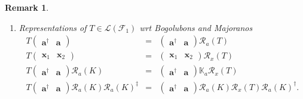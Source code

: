 \documentclass[aps,preprint]{revtex4}
\newtheorem{remark}[theorem]{Remark}
\begin{document}
\begin{remark}
\begin{enumerate}
\item Representations of $T\in \mathcal{L}\left( \mathcal{F}_{1}\right) $
wrt Bogolubons and Majoranos 
\begin{eqnarray}
T\left( 
\begin{array}{cc}
\mathbf{a}^{\dagger } & \mathbf{a}%
\end{array}%
\right) &=&\left( 
\begin{array}{cc}
\mathbf{a}^{\dagger } & \mathbf{a}%
\end{array}%
\right) \mathcal{R}_{a}\left( T\right) \\
T\left( 
\begin{array}{cc}
\mathbf{x}_{1} & \mathbf{x}_{2}%
\end{array}%
\right) &=&\left( 
\begin{array}{cc}
\mathbf{x}_{1} & \mathbf{x}_{2}%
\end{array}%
\right) \mathcal{R}_{x}\left( T\right) \\
T\left( 
\begin{array}{cc}
\mathbf{a}^{\dagger } & \mathbf{a}%
\end{array}%
\right) \mathcal{R}_{a}\left( K\right) &=&\left( 
\begin{array}{cc}
\mathbf{a}^{\dagger } & \mathbf{a}%
\end{array}%
\right) \mathbb{K}_{a}\mathcal{R}_{x}\left( T\right) \\
T\left( 
\begin{array}{cc}
\mathbf{a}^{\dagger } & \mathbf{a}%
\end{array}%
\right) \mathcal{R}_{a}\left( K\right) \mathcal{R}_{a}\left( K\right)
^{\ddagger } &=&\left( 
\begin{array}{cc}
\mathbf{a}^{\dagger } & \mathbf{a}%
\end{array}%
\right) \mathcal{R}_{a}\left( K\right) \mathcal{R}_{x}\left( T\right) 
\mathcal{R}_{a}\left( K\right) ^{\dagger }.
\end{eqnarray}


\end{enumerate}
\end{remark}
\end{document}
